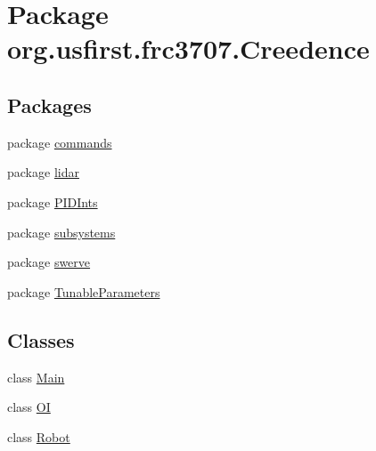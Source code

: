 \hypertarget{namespaceorg_1_1usfirst_1_1frc3707_1_1_creedence}{}\section{Package org.\+usfirst.\+frc3707.\+Creedence}
\label{namespaceorg_1_1usfirst_1_1frc3707_1_1_creedence}
\subsection*{Packages}
\begin{DoxyCompactItemize}
\item 
package \mbox{\hyperlink{namespaceorg_1_1usfirst_1_1frc3707_1_1_creedence_1_1commands}{commands}}
\item 
package \mbox{\hyperlink{namespaceorg_1_1usfirst_1_1frc3707_1_1_creedence_1_1lidar}{lidar}}
\item 
package \mbox{\hyperlink{namespaceorg_1_1usfirst_1_1frc3707_1_1_creedence_1_1_p_i_d_ints}{P\+I\+D\+Ints}}
\item 
package \mbox{\hyperlink{namespaceorg_1_1usfirst_1_1frc3707_1_1_creedence_1_1subsystems}{subsystems}}
\item 
package \mbox{\hyperlink{namespaceorg_1_1usfirst_1_1frc3707_1_1_creedence_1_1swerve}{swerve}}
\item 
package \mbox{\hyperlink{namespaceorg_1_1usfirst_1_1frc3707_1_1_creedence_1_1_tunable_parameters}{Tunable\+Parameters}}
\end{DoxyCompactItemize}
\subsection*{Classes}
\begin{DoxyCompactItemize}
\item 
class \mbox{\hyperlink{classorg_1_1usfirst_1_1frc3707_1_1_creedence_1_1_main}{Main}}
\item 
class \mbox{\hyperlink{classorg_1_1usfirst_1_1frc3707_1_1_creedence_1_1_o_i}{OI}}
\item 
class \mbox{\hyperlink{classorg_1_1usfirst_1_1frc3707_1_1_creedence_1_1_robot}{Robot}}
\end{DoxyCompactItemize}
